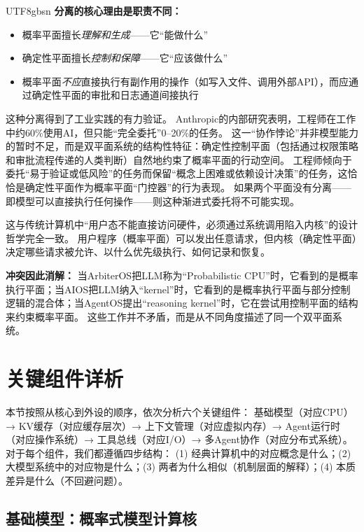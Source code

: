 \documentclass[11pt,a4paper]{article}
\begin{document}
\begin{CJK*}{UTF8}{gbsn}
\textbf{分离的核心理由是职责不同：}
\begin{itemize}[nosep]
\item 概率平面擅长\textit{理解和生成}——它``能做什么''
\item 确定性平面擅长\textit{控制和保障}——它``应该做什么''
\item 概率平面\textit{不应}直接执行有副作用的操作（如写入文件、调用外部API），而应通过确定性平面的审批和日志通道间接执行
\end{itemize}

这种分离得到了工业实践的有力验证。
Anthropic的内部研究表明，工程师在工作中约60\%使用AI，但只能``完全委托''0--20\%的任务\cite{anthropic2026agenticreport}。
这一``协作悖论''并非模型能力的暂时不足，而是双平面系统的结构性特征：确定性控制平面（包括通过权限策略和审批流程传递的人类判断）自然地约束了概率平面的行动空间。
工程师倾向于委托``易于验证或低风险''的任务而保留``概念上困难或依赖设计决策''的任务，这恰恰是确定性平面作为概率平面``门控器''的行为表现。
如果两个平面没有分离——即模型可以直接执行任何操作——则这种渐进式委托将不可能实现。

这与传统计算机中``用户态不能直接访问硬件，必须通过系统调用陷入内核''的设计哲学完全一致\cite{ostep_2023}。
用户程序（概率平面）可以发出任意请求，但内核（确定性平面）决定哪些请求被允许、以什么优先级执行、如何记录和恢复。

\textbf{冲突因此消解：}
当ArbiterOS把LLM称为``Probabilistic CPU''时，它看到的是概率执行平面；当AIOS把LLM纳入``kernel''时，它看到的是概率执行平面与部分控制逻辑的混合体；当AgentOS提出``reasoning kernel''时，它在尝试用控制平面的结构来约束概率平面。
这些工作并不矛盾，而是从不同角度描述了同一个双平面系统。

\section{关键组件详析}
\label{sec:components}

本节按照从核心到外设的顺序，依次分析六个关键组件：
基础模型（对应CPU）→ KV缓存（对应缓存层次）→ 上下文管理（对应虚拟内存）→ Agent运行时（对应操作系统）→ 工具总线（对应I/O）→ 多Agent协作（对应分布式系统）。
对于每个组件，我们都遵循四步结构：
(1) 经典计算机中的对应概念是什么；(2) 大模型系统中的对应物是什么；(3) 两者为什么相似（机制层面的解释）；(4) 本质差异是什么（不回避问题）。

\subsection{基础模型：概率式模型计算核}
\label{sec:model}


\end{CJK*}
\end{document}
